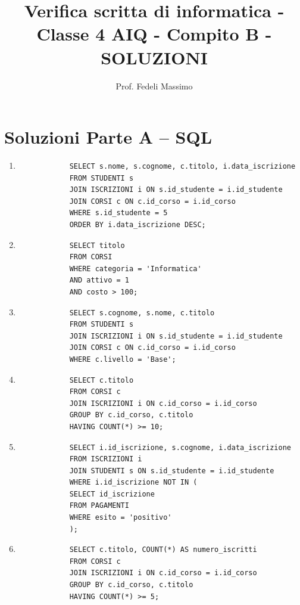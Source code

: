 \documentclass[a4paper,12pt]{article}
\title{Verifica scritta di informatica - Classe 4 AIQ - Compito B - SOLUZIONI}
\author{Prof. Fedeli Massimo}
\date{}
\begin{document}
	\maketitle
	
	\section*{Soluzioni Parte A -- SQL}
	
	\begin{enumerate}
		
		\item
		\begin{verbatim}
			SELECT s.nome, s.cognome, c.titolo, i.data_iscrizione
			FROM STUDENTI s
			JOIN ISCRIZIONI i ON s.id_studente = i.id_studente
			JOIN CORSI c ON c.id_corso = i.id_corso
			WHERE s.id_studente = 5
			ORDER BY i.data_iscrizione DESC;
		\end{verbatim}
		
		\item
		\begin{verbatim}
			SELECT titolo
			FROM CORSI
			WHERE categoria = 'Informatica'
			AND attivo = 1
			AND costo > 100;
		\end{verbatim}
		
		\item
		\begin{verbatim}
			SELECT s.cognome, s.nome, c.titolo
			FROM STUDENTI s
			JOIN ISCRIZIONI i ON s.id_studente = i.id_studente
			JOIN CORSI c ON c.id_corso = i.id_corso
			WHERE c.livello = 'Base';
		\end{verbatim}
		
		\item
		\begin{verbatim}
			SELECT c.titolo
			FROM CORSI c
			JOIN ISCRIZIONI i ON c.id_corso = i.id_corso
			GROUP BY c.id_corso, c.titolo
			HAVING COUNT(*) >= 10;
		\end{verbatim}
		
		\item
		\begin{verbatim}
			SELECT i.id_iscrizione, s.cognome, i.data_iscrizione
			FROM ISCRIZIONI i
			JOIN STUDENTI s ON s.id_studente = i.id_studente
			WHERE i.id_iscrizione NOT IN (
			SELECT id_iscrizione
			FROM PAGAMENTI
			WHERE esito = 'positivo'
			);
		\end{verbatim}
		
		\item
		\begin{verbatim}
			SELECT c.titolo, COUNT(*) AS numero_iscritti
			FROM CORSI c
			JOIN ISCRIZIONI i ON c.id_corso = i.id_corso
			GROUP BY c.id_corso, c.titolo
			HAVING COUNT(*) >= 5;
		\end{verbatim}
		

\end{enumerate}
\end{document}
